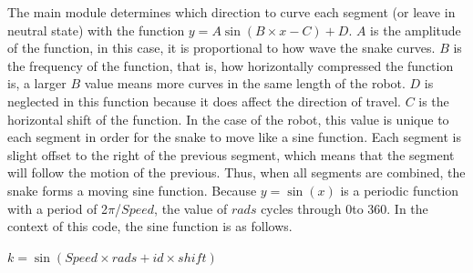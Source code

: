 \documentclass[twoside]{article}
\begin{document}
The main module determines which direction to curve each segment (or leave in neutral state) with the function \(y=A\sin(B\times x - C) + D\). \(A\) is the amplitude of the function, in this case, it is proportional to how wave the snake curves. \(B\) is the frequency of the function, that is, how horizontally compressed the function is, a larger \(B\) value means more curves in the same length of the robot. \(D\) is neglected in this function because it does affect the direction of travel. \(C\) is the horizontal shift of the function. In the case of the robot, this value is unique to each segment in order for the snake to move like a sine function. Each segment is slight offset to the right of the previous segment, which means that the segment will follow the motion of the previous. Thus, when all segments are combined, the snake forms a moving sine function. Because \(y=\sin(x)\) is a periodic function with a period of 2\(\pi\)/\(Speed\), the value of \(rads\) cycles through 0\degree to 360\degree . In the context of this code, the sine function is as follows. 

\centerline{\(k = \sin(Speed \times rads + id \times shift)\)}
\end{document}
